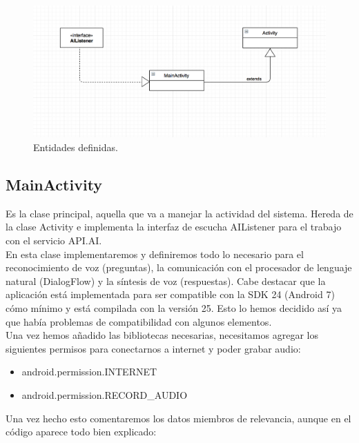 \begin{figure}[H] %
	\centering
	\includegraphics[scale=0.3]{imagenes/diagrama.png}  %
	\caption{Entidades definidas.}
\end{figure}

\subsection{MainActivity} Es la clase principal, aquella que va a manejar la actividad del sistema. Hereda de la clase Activity e implementa la interfaz de escucha AIListener para el trabajo con el servicio API.AI. \\

En esta clase implementaremos y definiremos todo lo necesario para el reconocimiento de voz (preguntas), la comunicación con el procesador de lenguaje natural (DialogFlow) y la síntesis de voz (respuestas). Cabe destacar que la aplicación está implementada para ser compatible con la SDK 24 (Android 7) cómo mínimo y está compilada con la versión 25. Esto lo hemos decidido así ya que había problemas de compatibilidad con algunos elementos.\\

Una vez hemos añadido las bibliotecas necesarias, necesitamos agregar los siguientes permisos para conectarnos a internet y poder grabar audio:

\begin{itemize}
	\item android.permission.INTERNET 

	\item android.permission.RECORD\_AUDIO 
\end{itemize}

Una vez hecho esto comentaremos los datos miembros de relevancia, aunque en el código aparece todo bien explicado:

